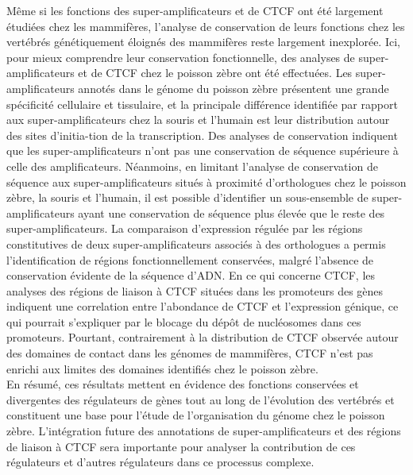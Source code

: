 	M\^eme si les fonctions des super-amplificateurs et de CTCF ont \'et\'e largement \'etudi\'ees chez les mammif\`eres, l’analyse de conservation de leurs fonctions chez les vert\'ebr\'es g\'en\'etiquement \'eloign\'es des mammif\`eres reste largement inexplor\'ee. Ici, pour mieux comprendre leur conservation fonctionnelle, des analyses de super-amplificateurs et de CTCF chez le poisson z\`ebre ont \'et\'e effectu\'ees. Les super-amplificateurs annot\'es dans le g\'enome du poisson z\`ebre pr\'esentent une grande sp\'ecificit\'e cellulaire et tissulaire, et la principale diff\'erence identifi\'ee par rapport aux super-amplificateurs chez la souris et l’humain est leur distribution autour des sites d'initia-tion de la transcription. Des analyses de conservation indiquent que les super-amplificateurs n'ont pas une conservation de s\'equence sup\'erieure \`a celle des amplificateurs. N\'eanmoins, en limitant l'analyse de conservation de s\'equence aux super-amplificateurs situ\'es \`a proximit\'e d'orthologues chez le poisson z\`ebre, la souris et l'humain, il est possible d'identifier un sous-ensemble de super-amplificateurs ayant une conservation de s\'equence plus \'elev\'ee que le reste des super-amplificateurs. La comparaison d'expression r\'egul\'ee par les r\'egions constitutives de deux super-amplificateurs associ\'es \`a des orthologues a permis l'identification de r\'egions fonctionnellement conserv\'ees, malgr\'e l'absence de conservation \'evidente de la s\'equence d’ADN. En ce qui concerne CTCF, les analyses des r\'egions de liaison \`a CTCF situ\'ees dans les promoteurs des g\`enes indiquent une correlation entre l’abondance de CTCF et l’expression g\'enique, ce qui pourrait s’expliquer par le blocage du d\'ep\^ot de nucl\'eosomes dans ces promoteurs. Pourtant, contrairement \`a la distribution de CTCF observ\'ee autour des domaines de contact dans les g\'enomes de mammif\`eres, CTCF n’est pas enrichi aux limites des domaines identifi\'es chez le poisson z\`ebre.\\

	En r\'esum\'e, ces r\'esultats mettent en \'evidence des fonctions conserv\'ees et divergentes des r\'egulateurs de g\`enes tout au long de l'\'evolution des vert\'ebr\'es et constituent une base pour l'\'etude de l'organisation du g\'enome chez le poisson z\`ebre. L'int\'egration future des annotations de super-amplificateurs et des r\'egions de liaison \`a CTCF sera importante pour analyser la contribution de ces r\'egulateurs et d'autres r\'egulateurs dans ce processus complexe.\\



